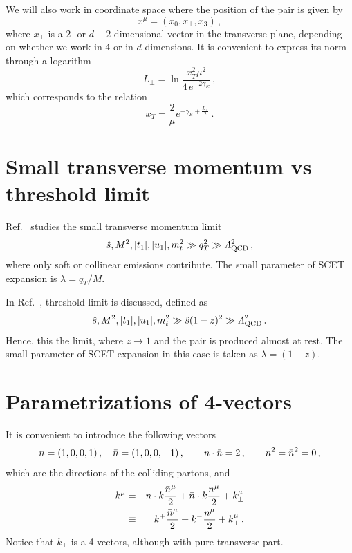 \documentclass[a4paper,11pt]{report}
\numberwithin{equation}{section}
\begin{document}
We will also work in coordinate space where the position of the \ttbar pair is
given by 
%
\begin{equation}
  x^\mu = (x_0, x_\perp, x_3)\,,
\end{equation}
%
where $x_\perp$ is a 2- or $d-2$-dimensional vector in the transverse plane,
depending on whether we work in 4 or in $d$ dimensions. It is convenient to
express its norm through a logarithm
%
\begin{equation}
  L_\perp = \ln\frac{x_T^2\mu^2}{4\, e^{-2\gamma_E}}\,,
\end{equation}
%
which corresponds to the relation
%
\begin{equation}
  x_T = \frac{2}{\mu} e^{-\gamma_E+\frac{L_\perp}{2}}\,.
\end{equation}

\section{Small transverse momentum vs threshold limit}

Ref.~\cite{Li:2013mia} studies the small transverse momentum limit
%
\begin{equation}
  {\hat s}, M^2, |t_1|, |u_1|, m_t^2 \gg q_T^2 \gg \Lambda^2_{\text{QCD}}\,,
\end{equation}
%
where only soft or collinear emissions contribute. The small parameter of SCET
expansion is $\lambda = q_T/M$.
 
In Ref.~\cite{Ahrens:2010zv}, threshold limit is discussed, defined as
%
\begin{equation}
  {\hat s}, M^2, |t_1|, |u_1|, m_t^2 \gg {\hat s} (1-z)^2 \gg \Lambda^2_{\text{QCD}}\,.
\end{equation}
%
Hence, this the limit, where $z\to 1$ and the \ttbar pair is produced almost at
rest. The small parameter of SCET expansion in this case is taken as $\lambda =
(1-z)$.


\section{Parametrizations of 4-vectors}

It is convenient to introduce the following vectors
%
\begin{equation}
  n = (1,0,0,1)\,,\quad \bar{n} = (1,0,0,-1)\,, \qquad n\cdot \bar{n} = 2\,,
  \qquad n^2 = \bar{n}^2 = 0\,,
  \label{eq:nnbar-defs}
\end{equation}
%
which are the directions of the colliding partons, and
%
\begin{eqnarray}
  k^\mu 
  & =  &
  n\cdot k \frac{\bar{n}^\mu}{2} + \bar{n} \cdot k \frac{n^\mu}{2} + 
  k_\perp^\mu \\
  & \equiv & 
  k^+ \frac{\bar{n}^\mu}{2} +  k^- \frac{n^\mu}{2} + k_\perp^\mu\,.
\end{eqnarray}
%
Notice that $k_\perp$ is a 4-vectors, although with pure transverse part.
\end{document}
